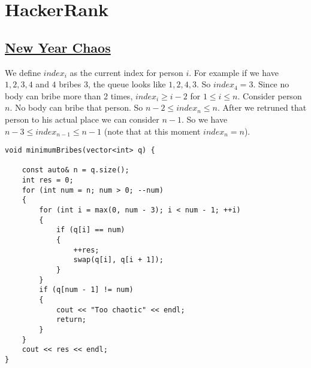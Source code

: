 \documentclass{book}
\begin{document}
	\chapter{HackerRank}
	\section{\href{https://www.hackerrank.com/challenges/new-year-chaos/problem}{New Year Chaos}}
	 We define $index_i$ as the current index for person $i$. For example if we have $1, 2, 3, 4$ and $4$ bribes $3$, the queue looks like $1, 2, 4, 3$. So $index_4 = 3$. Since no body can bribe more than 2 times, $index_i \ge i - 2$ for $1 \le i \le n$. Consider person $n$. No body can bribe that person. So $n - 2 \le index_n \le n$. After we retruned that person to his actual place we can consider $n - 1$. So we have $n - 3 \le index_{n - 1} \le n - 1$ (note that at this moment $index_n = n$).
	 \begin{lstlisting}
void minimumBribes(vector<int> q) {

    const auto& n = q.size();
    int res = 0;
    for (int num = n; num > 0; --num)
    {
        for (int i = max(0, num - 3); i < num - 1; ++i)
        {
            if (q[i] == num)
            {
                ++res;
                swap(q[i], q[i + 1]);
            }
        }
        if (q[num - 1] != num)
        {
            cout << "Too chaotic" << endl;
            return;
        }
    }
    cout << res << endl;
}
	 \end{lstlisting}
	 
\end{document}
